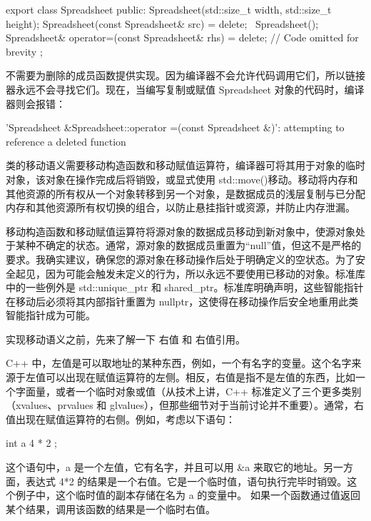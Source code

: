 \begin{cpp}
export class Spreadsheet
{
    public:
        Spreadsheet(std::size_t width, std::size_t height);
        Spreadsheet(const Spreadsheet& src) = delete;
        ~Spreadsheet();
        Spreadsheet& operator=(const Spreadsheet& rhs) = delete;
        // Code omitted for brevity
};
\end{cpp}

不需要为删除的成员函数提供实现。因为编译器不会允许代码调用它们，所以链接器永远不会寻找它们。现在，当编写复制或赋值 Spreadsheet 对象的代码时，编译器则会报错：

\begin{shell}
'Spreadsheet &Spreadsheet::operator =(const Spreadsheet &)': attempting to
reference a deleted function
\end{shell}


类的移动语义需要移动构造函数和移动赋值运算符，编译器可将其用于对象的临时对象，该对象在操作完成后将销毁，或显式使用 std::move()移动。移动将内存和其他资源的所有权从一个对象转移到另一个对象，是数据成员的浅层复制与已分配内存和其他资源所有权切换的组合，以防止悬挂指针或资源，并防止内存泄漏。

移动构造函数和移动赋值运算符将源对象的数据成员移动到新对象中，使源对象处于某种不确定的状态。通常，源对象的数据成员重置为“null”值，但这不是严格的要求。我确实建议，确保您的源对象在移动操作后处于明确定义的空状态。为了安全起见，因为可能会触发未定义的行为，所以永远不要使用已移动的对象。标准库中的一些例外是 std::unique\_ptr 和 shared\_ptr。标准库明确声明，这些智能指针在移动后必须将其内部指针重置为 nullptr，这使得在移动操作后安全地重用此类智能指针成为可能。

实现移动语义之前，先来了解一下 右值 和 右值引用。


C++ 中，左值是可以取地址的某种东西，例如，一个有名字的变量。这个名字来源于左值可以出现在赋值运算符的左侧。相反，右值是指不是左值的东西，比如一个字面量，或者一个临时对象或值（从技术上讲，C++ 标准定义了三个更多类别（xvalues、prvalues 和 glvalues），但那些细节对于当前讨论并不重要）。通常，右值出现在赋值运算符的右侧。例如，考虑以下语句：

\begin{cpp}
int a { 4 * 2 };
\end{cpp}

这个语句中，a 是一个左值，它有名字，并且可以用 \&a 来取它的地址。另一方面，表达式 4*2 的结果是一个右值。它是一个临时值，语句执行完毕时销毁。这个例子中，这个临时值的副本存储在名为 a 的变量中。 如果一个函数通过值返回某个结果，调用该函数的结果是一个临时右值。

